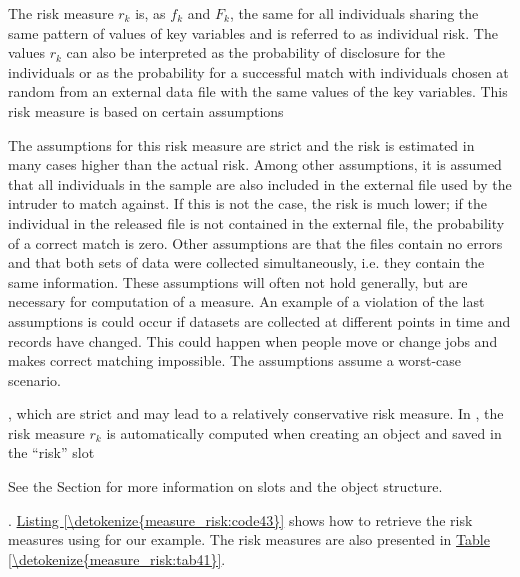 \documentclass[letterpaper,10pt,english]{sphinxmanual}
\begin{document}
The risk measure \(r_{k}\) is, as \(f_{k}\) and \(F_{k}\),
the same for all individuals sharing the same pattern of values of key
variables and is referred to as individual risk. The values
\(r_{k}\) can also be interpreted as the probability of disclosure
for the individuals or as the probability for a successful match with
individuals chosen at random from an external data file with the same
values of the key variables. This risk measure is based on certain
assumptions %
\begin{footnote}[6]\sphinxAtStartFootnote
The assumptions for this risk measure are strict and the risk is
estimated in many cases higher than the actual risk. Among other
assumptions, it is assumed that all individuals in the sample are
also included in the external file used by the intruder to match
against. If this is not the case, the risk is much lower; if the
individual in the released file is not contained in the external
file, the probability of a correct match is zero. Other assumptions
are that the files contain no errors and that both sets of data were
collected simultaneously, i.e. they contain the same information.
These assumptions will often not hold generally, but are necessary
for computation of a measure. An example of a violation of the last
assumptions is could occur if datasets are collected at different
points in time and records have changed. This could happen when
people move or change jobs and makes correct matching impossible. The
assumptions assume a worst-case scenario.
%
\end{footnote}, which are strict and may lead to a
relatively conservative risk measure. In , the risk measure
\(r_{k}\) is automatically computed when creating an 
object and saved in the “risk” slot %
\begin{footnote}[7]\sphinxAtStartFootnote
See the Section 
for more information on slots and the 
object structure.
%
\end{footnote}. \hyperref[\detokenize{measure_risk:code43}]{Listing \ref{\detokenize{measure_risk:code43}}}
shows how to retrieve the risk measures using  for our
example. The risk measures are also presented in \hyperref[\detokenize{measure_risk:tab41}]{Table \ref{\detokenize{measure_risk:tab41}}}.
\end{document}
